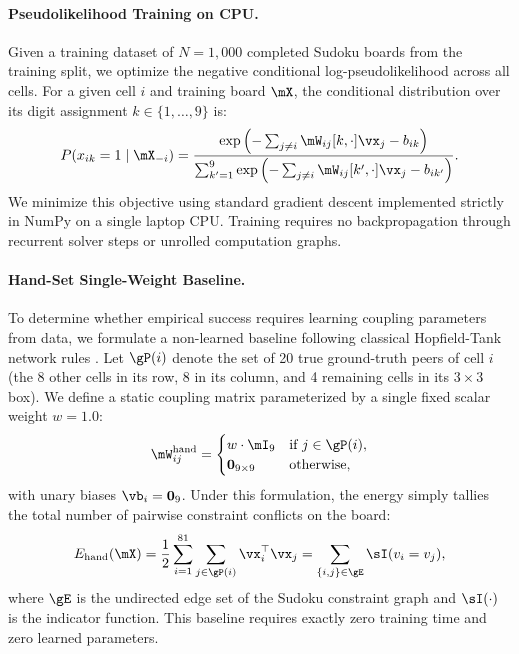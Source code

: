 \documentclass{article} %
\begin{document}
\paragraph{Pseudolikelihood Training on CPU.}
Given a training dataset of $N = 1{,}000$ completed Sudoku boards from the training split, we optimize the negative conditional log-pseudolikelihood across all cells. For a given cell $i$ and training board $\mX$, the conditional distribution over its digit assignment $k \in \{1, \dots, 9\}$ is:
\begin{equation}
\label{eq:pseudolikelihood}
P(x_{ik} = 1 \mid \mX_{-i}) = \frac{\exp\left( - \sum_{j \neq i} \mW_{ij}[k, \cdot] \vx_j - b_{ik} \right)}{\sum_{k'=1}^9 \exp\left( - \sum_{j \neq i} \mW_{ij}[k', \cdot] \vx_j - b_{ik'} \right)}.
\end{equation}
We minimize this objective using standard gradient descent implemented strictly in NumPy on a single laptop CPU. Training requires no backpropagation through recurrent solver steps or unrolled computation graphs.

\paragraph{Hand-Set Single-Weight Baseline.}
To determine whether empirical success requires learning coupling parameters from data, we formulate a non-learned baseline following classical Hopfield-Tank network rules \citep{Hoover2026ClassicalEnergies}. Let $\gP(i)$ denote the set of 20 true ground-truth peers of cell $i$ (the 8 other cells in its row, 8 in its column, and 4 remaining cells in its $3 \times 3$ box). We define a static coupling matrix parameterized by a single fixed scalar weight $w = 1.0$:
\begin{equation}
\label{eq:handset_energy}
\mW_{ij}^{\text{hand}} = \begin{cases}
w \cdot \mI_9 & \text{if } j \in \gP(i), \\
\mathbf{0}_{9 \times 9} & \text{otherwise},
\end{cases}
\end{equation}
with unary biases $\vb_i = \mathbf{0}_9$. Under this formulation, the energy simply tallies the total number of pairwise constraint conflicts on the board:
\begin{equation}
E_{\text{hand}}(\mX) = \frac{1}{2} \sum_{i=1}^{81} \sum_{j \in \gP(i)} \vx_i^\top \vx_j = \sum_{\{i, j\} \in \gE} \sI(v_i = v_j),
\end{equation}
where $\gE$ is the undirected edge set of the Sudoku constraint graph and $\sI(\cdot)$ is the indicator function. This baseline requires exactly zero training time and zero learned parameters.
\end{document}
